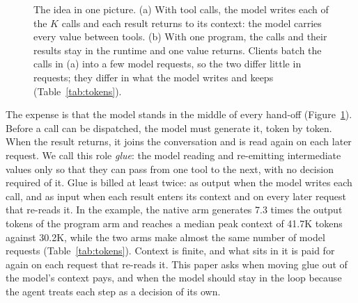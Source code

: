 \documentclass[10pt,twocolumn]{article}
\begin{document}
\begin{figure}[t]
{%
}
\caption{The idea in one picture.  (a) With tool calls, the model writes each
of the $K$ calls and each result returns to its context: the model carries
every value between tools.  (b) With one program, the calls and their results
stay in the runtime and one value returns.  Clients batch the calls in (a)
into a few model requests, so the two differ little in requests; they differ
in what the model writes and keeps (Table~\ref{tab:tokens}).}
\label{fig:glue}
\end{figure}

The expense is that the model stands in the middle of every hand-off
(Figure~\ref{fig:glue}).  Before
a call can be dispatched, the model must generate it, token by token.  When
the result returns, it joins the conversation and is read again on each later
request.  We call this role \emph{glue}: the model reading and re-emitting
intermediate values only so that they can pass from one tool to the next,
with no decision required of it.  Glue is billed at least twice: as output
when the model writes each call, and as input when each result enters its
context and on every later request that re-reads it.  In the
example, the native arm generates 7.3 times the output tokens of the program
arm and reaches a median peak context of 41.7K tokens against 30.2K, while
the two arms make almost the same number of model requests
(Table~\ref{tab:tokens}).  Context is finite, and what sits in it is paid for
again on each request that re-reads it.  This paper asks when moving glue out
of the model's context pays, and when the model should stay in the loop
because the agent treats each step as a decision of its own.
\end{document}
